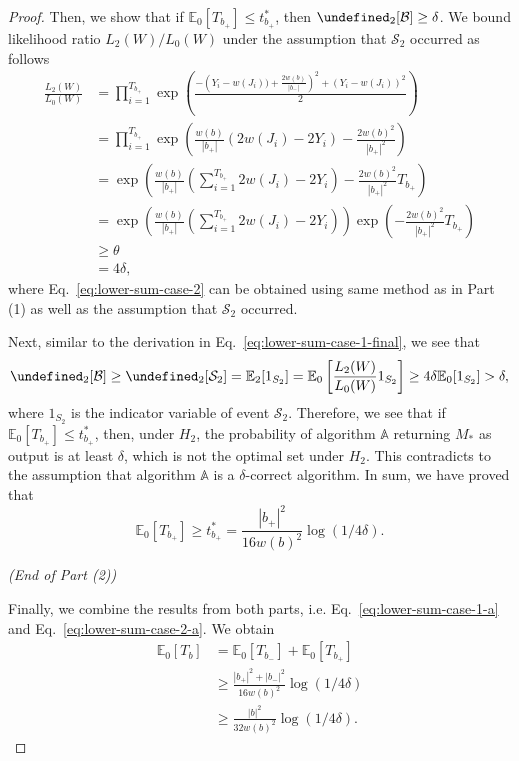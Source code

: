 \documentclass{article}
\newcommand{\E}{\mathbb E}
\let\Pr\undefined
\DeclareMathOperator{\Pr}{Pr}
\begin{document}
\begin{spacing}{1.1}
\begin{proof}
Then, we show that if $\E_0[T_{b_+}] \le t_{b_+}^*$, then $\Pr_2[\mathcal B] \ge \delta$.
We bound likelihood ratio $L_2(W)/L_0(W)$ under the assumption that $\mathcal S_2$ occurred as follows
\begin{align}
  \frac{L_2(W)}{L_0(W)} 
  &= \prod_{i=1}^{T_{b_+}}
  \exp\left(\frac{-\left(Y_i-w(J_i))+\frac{2w(b)}{|b_-|}\right)^2+(Y_i-w(J_i))^2}{2}\right) \nonumber \\
  &= \prod_{i=1}^{T_{b_+}}
  \exp\left(\frac{w(b)}{|b_+|}(2w(J_i)- 2Y_i)-\frac{2w(b)^2}{|b_+|^2}\right) \nonumber \\
  &= \exp\left(\frac{w(b)}{|b_+|}\left(\sum_{i=1}^{T_{b_+}}2w(J_i)-2Y_i\right)-\frac{2w(b)^2}{|b_+|^2}T_{b_+}\right) \nonumber \\
  &= \exp\left(\frac{w(b)}{|b_+|}\left(\sum_{i=1}^{T_{b_+}}2w(J_i)-2Y_i\right)\right)\exp\left(-\frac{2w(b)^2}{|b_+|^2}T_{b_+}\right) \nonumber \\
  &\ge \theta \label{eq:lower-sum-case-2}\\
  & = 4\delta \nonumber,
\end{align}
where Eq.~\eqref{eq:lower-sum-case-2} can be obtained using same method as in Part (1) as well as the assumption that $\mathcal S_2$ occurred.

Next, similar to the derivation in Eq.~\eqref{eq:lower-sum-case-1-final}, we see that
$$
\Pr_2[\mathcal B] \ge \Pr_2[\mathcal S_2] = \E_2[1_{S_2}] 
				  = \E_0\left[\frac{L_2(W)}{L_0(W)} 1_{S_2}\right]
				  \ge 4\delta \E_0[1_{S_2}] > \delta,
$$
where $1_{S_2}$ is the indicator variable of event $\mathcal S_2$.
Therefore, we see that if $\E_0[T_{b_+}] \le t_{b_+}^*$, then, under $H_2$, the probability of algorithm $\mathbb A$ returning $M_*$ as output is at least $\delta$, which is not the optimal set under $H_2$. 
This contradicts to the assumption that algorithm $\mathbb A$ is a $\delta$-correct algorithm. 
In sum, we have proved that 
\begin{equation}
\label{eq:lower-sum-case-2-a}
\E_0[T_{b_+}] \ge t_{b_+}^* = \frac{|b_+|^2}{16 w(b)^2}\log(1/4\delta).
\end{equation}

\emph{(End of Part (2))}

Finally, we combine the results from both parts, i.e. Eq.~\eqref{eq:lower-sum-case-1-a} and Eq.~\eqref{eq:lower-sum-case-2-a}.
We obtain
\begin{align*}
  \E_0[T_b] &= \E_0[T_{b_-}]+\E_0[T_{b_+}] \\
  		    &\ge \frac{|b_+|^2+|b_-|^2}{16 w(b)^2}\log(1/4\delta) \\
  		    &\ge \frac{|b|^2}{32 w(b)^2}\log(1/4\delta).
\end{align*}
\end{proof}


\end{spacing}
\end{document}

